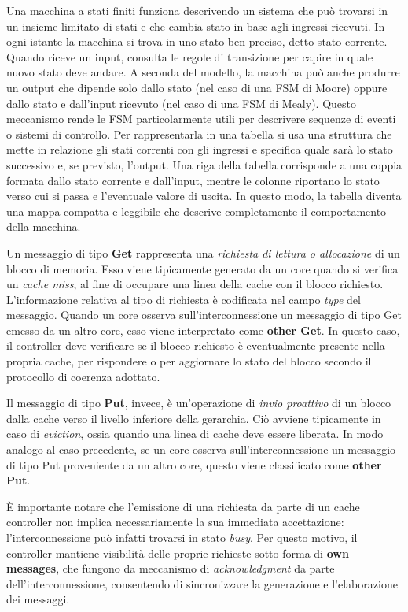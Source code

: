 \begin{warn}
    Una macchina a stati finiti funziona descrivendo un sistema che può trovarsi in un insieme limitato di stati e che cambia stato in base agli ingressi ricevuti. In ogni istante la macchina si trova in uno stato ben preciso, detto stato corrente. Quando riceve un input, consulta le regole di transizione per capire in quale nuovo stato deve andare. A seconda del modello, la macchina può anche produrre un output che dipende solo dallo stato (nel caso di una FSM di Moore) oppure dallo stato e dall'input ricevuto (nel caso di una FSM di Mealy). Questo meccanismo rende le FSM particolarmente utili per descrivere sequenze di eventi o sistemi di controllo.
    Per rappresentarla in una tabella si usa una struttura che mette in relazione gli stati correnti con gli ingressi e specifica quale sarà lo stato successivo e, se previsto, l'output. Una riga della tabella corrisponde a una coppia formata dallo stato corrente e dall'input, mentre le colonne riportano lo stato verso cui si passa e l'eventuale valore di uscita. In questo modo, la tabella diventa una mappa compatta e leggibile che descrive completamente il comportamento della macchina.
\end{warn}

\noindent
Un messaggio di tipo \textbf{Get} rappresenta una \textit{richiesta di lettura o allocazione} di un blocco di memoria. Esso viene tipicamente generato da un core quando si verifica un 
\textit{cache miss}, al fine di occupare una linea della cache con il blocco richiesto. 
L'informazione relativa al tipo di richiesta è codificata nel campo \textit{type} del messaggio. 
Quando un core osserva sull'interconnessione un messaggio di tipo Get emesso da un altro core, esso viene interpretato come \textbf{other Get}. In questo caso, il controller deve verificare se il blocco richiesto è eventualmente presente nella propria cache, per rispondere o per aggiornare lo stato del blocco secondo il protocollo di coerenza adottato.  

\noindent
Il messaggio di tipo \textbf{Put}, invece, è un'operazione di \textit{invio proattivo} di un blocco dalla cache verso il livello inferiore della gerarchia. Ciò avviene tipicamente in caso di \textit{eviction}, ossia quando una linea di cache deve essere liberata. In modo analogo al caso precedente, se un core osserva sull’interconnessione un messaggio di tipo Put proveniente da un altro core, questo viene classificato come \textbf{other Put}.  

\noindent
È importante notare che l'emissione di una richiesta da parte di un cache controller non implica necessariamente la sua immediata accettazione: l'interconnessione può infatti trovarsi in stato \textit{busy}. Per questo motivo, il controller mantiene visibilità delle proprie richieste sotto forma di \textbf{own messages}, che fungono da meccanismo di \textit{acknowledgment} da parte dell'interconnessione, consentendo di sincronizzare la generazione e l'elaborazione dei messaggi.  


